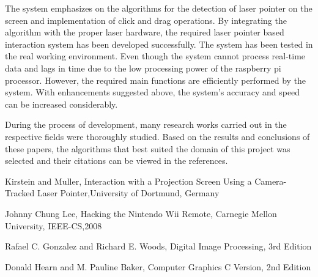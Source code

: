 \documentclass[12pt, a4paper]{article}
\begin{document}
   The system emphasizes on the algorithms for the detection of laser pointer on the screen and implementation of click  and drag operations. By integrating the algorithm with the proper laser hardware, the required laser pointer based interaction system has been developed successfully. The system has been tested in the real working environment. Even though the system cannot process real-time data and lags in time due to the low processing power of the raspberry pi processor. However, the required main functions are efficiently performed by the system. With enhancements suggested above, the system's accuracy and speed can be increased considerably. 
   
   During the process of development, many research works carried out in the respective fields were thoroughly studied. Based on the results and conclusions of these papers, the algorithms that best suited the domain of this project was selected and their citations can be viewed in the references.
   
   
\newpage
\renewcommand{\refname}{REFERENCES}
\begin{thebibliography}{}
	 Kirstein and Muller, Interaction with a Projection Screen Using a Camera-Tracked Laser Pointer,University of Dortmund, Germany 
	

	 Johnny Chung Lee, Hacking the Nintendo Wii Remote, Carnegie 		   Mellon University, IEEE-CS,2008 

	
	 Rafael C. Gonzalez and Richard E. Woods, Digital Image Processing, 3rd Edition
	
	 Donald Hearn and M. Pauline Baker, Computer Graphics C Version, 2nd Edition 
\end{thebibliography}
\end{document}
